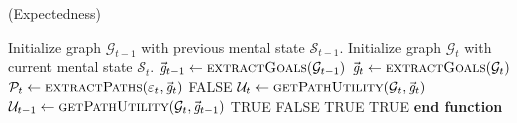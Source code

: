 \documentclass{article}
\begin{document}
\begin{algorithm}
	\caption{(Expectedness)}
	\label{array-sum}
	\begin{algorithmic}[1]
			\Statex
			\State Initialize graph $\mathcal{G}_{t-1}$ with previous mental state
			$\mathcal{S}_{t-1}$.
			\State Initialize graph $\mathcal{G}_{t}$ with current mental state
			$\mathcal{S}_{t}$.
			\Statex
			\State $\vec{\mathit{g}}_{t-1} \gets \Call{extractGoals}{\mathcal{G}_{t-1}}$
			\State $\vec{\mathit{g}}_{t} \gets \Call{extractGoals}{\mathcal{G}_{t}}$
			\Statex
					\State $\mathcal{P}_{t} \gets \Call{extractPaths}{\varepsilon_t,
					\vec{\mathit{g}}_{t}}$
						\State \Return FALSE
					\Else
						\State $\mathcal{U}_{t} \gets
						\Call{getPathUtility}{\mathcal{G}_{t}, \vec{\mathit{g}}_{t}}$
						\State $\mathcal{U}_{t-1} \gets \Call{getPathUtility}{\mathcal{G}_{t},
						\vec{\mathit{g}}_{t-1}}$
							\State \Return TRUE
						\Else
							\State \Return FALSE
						\EndIf
					\EndIf
				\Else {}
					\State \Return TRUE
				\EndIf
			\Else {}
				\State \Return TRUE
			\EndIf
		\EndFunction
		\State \textbf{end function}
	\end{algorithmic}
\end{algorithm}
\end{document}
